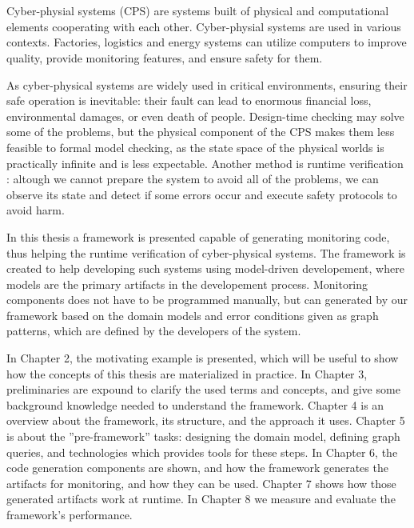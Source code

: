 \chapter{\bevezetes}

Cyber-physial systems (CPS) are systems built of physical and computational elements cooperating with each other.
Cyber-physial systems are used in various contexts. 
Factories, logistics and energy systems can utilize computers to improve quality, provide monitoring features, and ensure safety for them.

As cyber-physical systems are widely used in critical environments, ensuring their safe operation is inevitable: their fault can lead to enormous financial loss, environmental damages, or even death of people.
Design-time checking may solve some of the problems, but the physical component of the CPS makes them less feasible to formal model checking, as the state space of the physical worlds is practically infinite and is less expectable.
Another method is runtime verification \cite{fasecikk}: altough we cannot prepare the system to avoid all of the problems, we can observe its state and detect if some errors occur and execute safety protocols to avoid harm. 


In this thesis a framework is presented capable of generating monitoring code, thus helping the runtime verification of cyber-physical systems. 
The framework is created to help developing such systems using model-driven developement, where models are the primary artifacts in the developement process.
Monitoring components does not have to be programmed manually, but can generated by our framework based on the domain models and error conditions given as graph patterns, which are defined by the developers of the system.


In Chapter 2, the motivating example is presented, which will be useful to show how the concepts of this thesis are materialized in practice.
In Chapter 3, preliminaries are expound to clarify the used terms and concepts, and give some background knowledge needed to understand the framework.
Chapter 4 is an overview about the framework, its structure, and the approach it uses.
Chapter 5 is about the ''pre-framework'' tasks: designing the domain model, defining graph queries, and technologies which provides tools for these steps.
In Chapter 6, the code generation components are shown, and how the framework generates the artifacts for monitoring, and how they can be used.
Chapter 7 shows how those generated artifacts work at runtime. 
In Chapter 8 we measure and evaluate the framework's performance.


